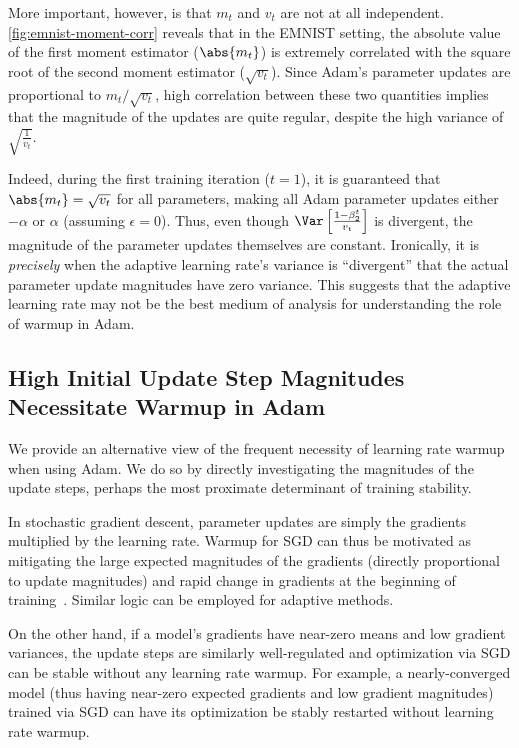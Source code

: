 {More important, however, is that $m_t$ and $v_t$ are not at all independent. \cref*{fig:emnist-moment-corr} reveals that in the EMNIST setting, the absolute value of the first moment estimator ($\abs{m_t}$) is extremely correlated with the square root of the second moment estimator ($\sqrt{v_t}$). Since Adam's parameter updates are proportional to $m_t / \sqrt{v_t}$, high correlation between these two quantities implies that the magnitude of the updates are quite regular, despite the high variance of $\sqrt{\frac{1}{v_t}}$.

Indeed, during the first training iteration ($t = 1$), it is guaranteed that $\abs{m_t} = \sqrt{v_t}$ for all parameters, making all Adam parameter updates either $-\alpha$ or $\alpha$ (assuming $\epsilon = 0$). Thus, even though $\Var \left[ \frac{1 - \beta_2^t}{v_t} \right]$ is divergent, the magnitude of the parameter updates themselves are constant. Ironically, it is \emph{precisely} when the adaptive learning rate's variance is ``divergent'' that the actual parameter update magnitudes have zero variance. This suggests that the adaptive learning rate may not be the best medium of analysis for understanding the role of warmup in Adam.

\subsection{High Initial Update Step Magnitudes Necessitate Warmup in Adam}
\label{sec:radam-update-step-mag}

We provide an alternative view of the frequent necessity of learning rate warmup when using Adam. We do so by directly investigating the magnitudes of the update steps, perhaps the most proximate determinant of training stability.

In stochastic gradient descent, parameter updates are simply the gradients multiplied by the learning rate. Warmup for SGD can thus be motivated as mitigating the large expected magnitudes of the gradients (directly proportional to update magnitudes) and rapid change in gradients at the beginning of training~\citep{goyal2017imagenet, gotmare2019heuristics}. Similar logic can be employed for adaptive methods.

On the other hand, if a model's gradients have near-zero means and low gradient variances, the update steps are similarly well-regulated and optimization via SGD can be stable without any learning rate warmup. For example, a nearly-converged model (thus having near-zero expected gradients and low gradient magnitudes) trained via SGD can have its optimization be stably restarted without learning rate warmup.

}
